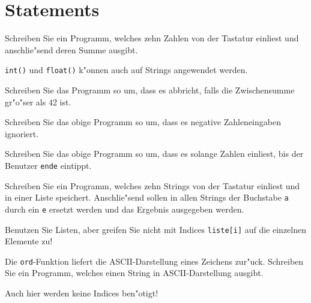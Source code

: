 \section*{Statements}
\begin{aufgabe}
Schreiben Sie ein Programm, welches zehn Zahlen von der Tastatur einliest und anschlie"send deren Summe ausgibt.

\hinweis \lstinline{int()} und \lstinline{float()} k"onnen auch auf Strings angewendet werden.
\begin{teilaufgabe}
Schreiben Sie das Programm so um, dass es abbricht, falls die Zwischensumme gr"o"ser als 42 ist.
\end{teilaufgabe}
\begin{teilaufgabe}
Schreiben Sie das obige Programm so um, dass es negative Zahleneingaben ignoriert.\end{teilaufgabe}
\begin{teilaufgabe}
Schreiben Sie das obige Programm so um, dass es solange Zahlen einliest, bis der Benutzer \texttt{ende} eintippt.
\end{teilaufgabe}
\end{aufgabe}

\begin{aufgabe}
Schreiben Sie ein Programm, welches zehn Strings von der Tastatur einliest und in einer Liste speichert. Anschlie"send sollen in allen Strings der Buchstabe \texttt{a} durch ein \texttt{e} ersetzt werden und das Ergebnis ausgegeben werden. 

\hinweis Benutzen Sie Listen, aber greifen Sie nicht mit Indices \lstinline{liste[i]} auf die einzelnen Elemente zu!
\end{aufgabe}

\begin{aufgabe}
Die \lstinline{ord}-Funktion liefert die ASCII-Darstellung eines Zeichens zur"uck. Schreiben Sie ein Programm, welches einen String in ASCII-Darstellung ausgibt.

\hinweis Auch hier werden keine Indices ben"otigt!
\end{aufgabe}

